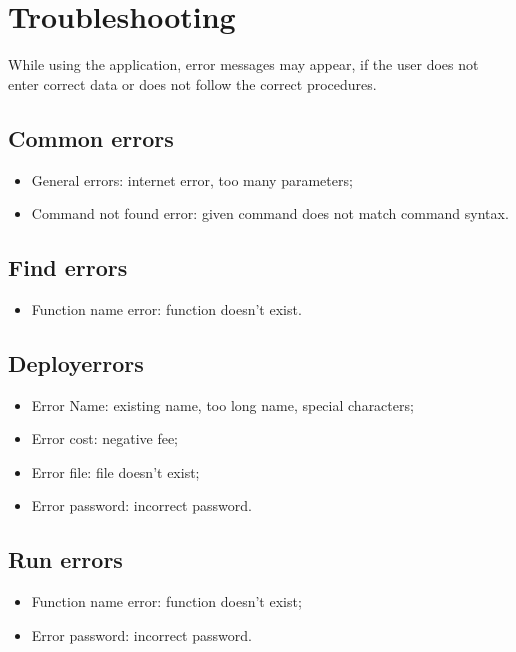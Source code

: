 \section{Troubleshooting}
While using the application, error messages may appear, if the user does not enter correct data or does not follow the correct procedures. 
\subsection{Common errors}
\begin{itemize}
	\item General errors: internet error, too many parameters;
	\item Command not found error: given command does not match command syntax.
\end{itemize}
\subsection{Find errors}
\begin{itemize}
	\item Function name error: function doesn't exist.
\end{itemize}
\subsection{Deploy\glo errors}
\begin{itemize}
	\item Error Name: existing name, too long name, special characters;
	\item Error cost: negative fee;
	\item Error file: file doesn't exist;
	\item Error password: incorrect password.
\end{itemize}
\subsection{Run errors}
\begin{itemize}
	\item Function name error: function doesn't exist;
	\item Error password: incorrect password.
\end{itemize}
